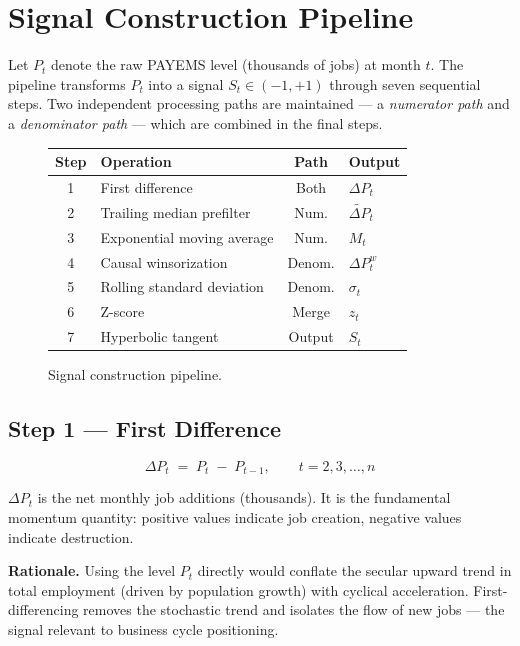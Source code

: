 \documentclass[11pt, a4paper]{article}
\newcommand{\dP}{\Delta P}
\begin{document}
\section{Signal Construction Pipeline}
\label{sec:pipeline}

Let $P_t$ denote the raw PAYEMS level (thousands of jobs) at month $t$.
The pipeline transforms $P_t$ into a signal $S_t \in (-1, +1)$
through seven sequential steps. Two independent processing paths are
maintained — a \emph{numerator path} and a \emph{denominator path} —
which are combined in the final steps.

\begin{figure}[H]
\centering
\renewcommand{\arraystretch}{1.6}
\begin{tabular}{clcl}
\toprule
\textbf{Step} & \textbf{Operation} & \textbf{Path} & \textbf{Output} \\
\midrule
1 & First difference          & Both   & $\dP_t$ \\
2 & Trailing median prefilter & Num.   & $\tilde{\dP}_t$ \\
3 & Exponential moving average& Num.   & $M_t$ \\
4 & Causal winsorization      & Denom. & $\dP^w_t$ \\
5 & Rolling standard deviation& Denom. & $\sigma_t$ \\
6 & Z-score                   & Merge  & $z_t$ \\
7 & Hyperbolic tangent         & Output & $S_t$ \\
\bottomrule
\end{tabular}
\caption{Signal construction pipeline.}
\end{figure}

\subsection{Step 1 — First Difference}
\label{sec:step1}

\begin{equation}
  \dP_t \;=\; P_t \;-\; P_{t-1}, \qquad t = 2, 3, \ldots, n
\end{equation}

$\dP_t$ is the net monthly job additions (thousands). It is the
fundamental momentum quantity: positive values indicate job creation,
negative values indicate destruction.

\textbf{Rationale.} Using the level $P_t$ directly would conflate
the secular upward trend in total employment (driven by population
growth) with cyclical acceleration. First-differencing removes the
stochastic trend and isolates the flow of new jobs — the signal
relevant to business cycle positioning.
\end{document}
